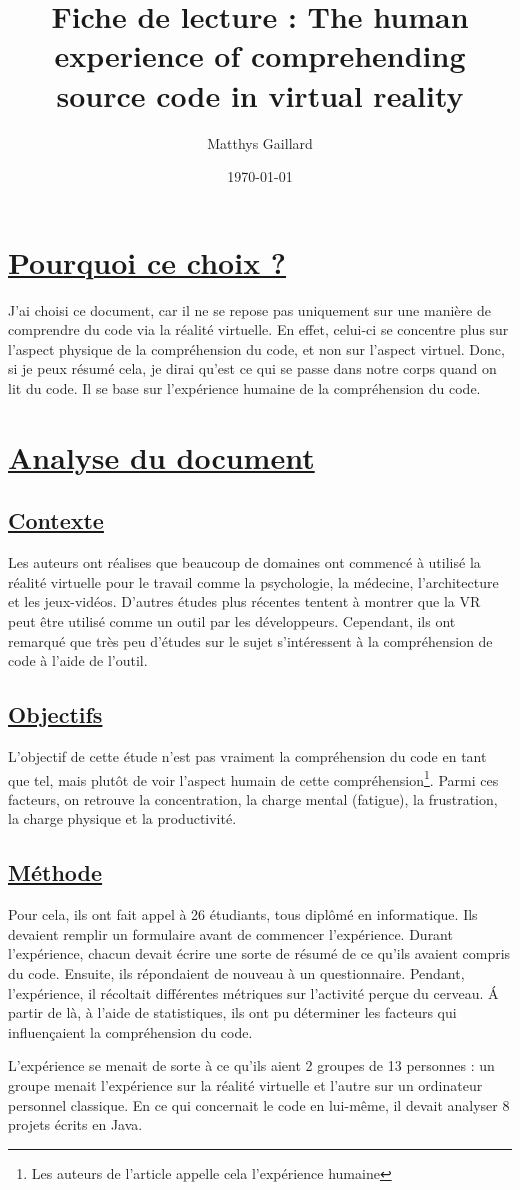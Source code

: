 \documentclass[a4paper,10pt, oneside]{article}
\title{Fiche de lecture : The human experience of comprehending source code in virtual reality}
\author{Matthys Gaillard}
\date{\today}
\newcommand{\li}{\newline}
\begin{document}
\maketitle
\section{\ul{Pourquoi ce choix ?}}
		\par J'ai choisi ce document\cite{A10}, car il ne se repose pas uniquement sur une manière de comprendre du code via la réalité virtuelle.
		En effet, celui-ci se concentre plus sur l'aspect physique de la compréhension du code, et non sur l'aspect virtuel. Donc, si je peux résumé cela,
		je dirai qu'est ce qui se passe dans notre corps quand on lit du code. Il se base sur l'expérience humaine de la compréhension du code.
\section{\ul{Analyse du document}}
\subsection{\ul{Contexte}}
		\par Les auteurs ont réalises que beaucoup de domaines ont commencé à utilisé la réalité virtuelle pour le travail comme la psychologie, la médecine, l'architecture et les jeux-vidéos.
		D'autres études plus récentes tentent à montrer que la VR peut être utilisé comme un outil par les développeurs. Cependant, ils ont remarqué que très peu d'études sur le sujet s'intéressent à la
		compréhension de code à l'aide de l'outil.
\subsection{\ul{Objectifs}}
		\par L'objectif de cette étude n'est pas vraiment la compréhension du code en tant que tel, mais plutôt de voir l'aspect humain de cette compréhension\footnote{Les auteurs de l'article appelle cela l'expérience humaine}.
		Parmi ces facteurs, on retrouve la concentration, la charge mental (fatigue), la frustration, la charge physique et la productivité.
\subsection{\ul{Méthode}}
		\par Pour cela, ils ont fait appel à 26 étudiants, tous diplômé en informatique. Ils devaient remplir un formulaire avant de commencer l'expérience. Durant l'expérience, chacun
		devait écrire une sorte de résumé de ce qu'ils avaient compris du code. Ensuite, ils répondaient de nouveau à un questionnaire. Pendant, l'expérience, il récoltait différentes métriques sur l'activité perçue du cerveau.
		Á partir de là, à l'aide de statistiques, ils ont pu déterminer les facteurs qui influençaient la compréhension du code.\li
		\par L'expérience se menait de sorte à ce qu'ils aient 2 groupes de 13 personnes : un groupe menait l'expérience sur la réalité virtuelle et l'autre sur un ordinateur personnel classique.
		En ce qui concernait le code en lui-même, il devait analyser 8 projets écrits en Java.
\end{document}
